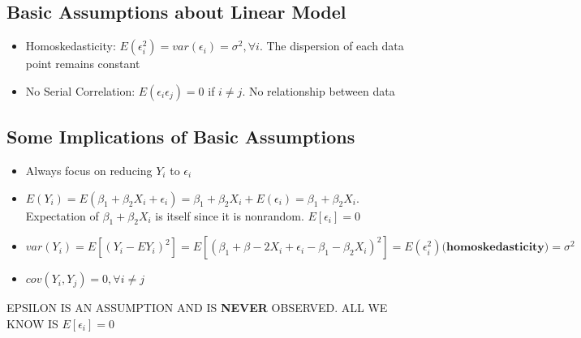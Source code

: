\documentclass[10pt, oneside]{article}
\begin{document}
\subsection{Basic Assumptions about Linear Model}
\begin{itemize}
    \item Homoskedasticity: $E(\epsilon_i^2) = var(\epsilon_i) = \sigma^2, \forall i$. The dispersion of each data point remains constant
    \item No Serial Correlation: $E(\epsilon_i \epsilon_j) = 0$ if $i\neq j$. No relationship between data
\end{itemize}

\subsection{Some Implications of Basic Assumptions}
\begin{itemize}
    \item Always focus on reducing $Y_i$ to $\epsilon_i$
    \item $E(Y_i)=E(\beta_1 + \beta_2 X_i + \epsilon_i) =\beta_1 + \beta_2 X_i + E(\epsilon_i) =\beta_1+\beta_2 X_i$. Expectation of $\beta_1 + \beta_2 X_i$ is itself since it is nonrandom. $E[\epsilon_i]=0$
    \item $var(Y_i) = E[(Y_i -EY_i)^2] = E[(\beta_1+\beta-2 X_i + \epsilon_i -\beta_1 -\beta_2 X_i)^2]=E(\epsilon_i ^2) \textbf{(homoskedasticity)}= \sigma ^2$
    \item $cov(Y_i, Y_j) = 0, \forall i \neq j$
\end{itemize}

EPSILON IS AN ASSUMPTION AND IS \textbf{NEVER} OBSERVED. ALL WE KNOW IS $E[\epsilon_i] = 0$
\end{document}
